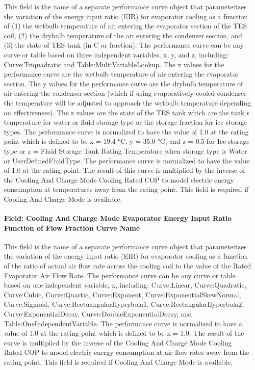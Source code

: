 This field is the name of a separate performance curve object that parameterizes the variation of the energy input ratio (EIR) for evaporator cooling as a function of (1) the wetbulb temperature of air entering the evaporator section of the TES coil, (2) the drybulb temperature of the air entering the condenser section, and (3) the state of TES tank (in C or fraction). The performance curve can be any curve or table based on three independent variables, x, y, and z, including: Curve:Triquadratic and Table:MultiVariableLookup. The x values for the performance curve are the wetbulb temperature of air entering the evaporator section. The y values for the performance curve are the drybulb temperature of air entering the condenser section (which if using evaporatively-cooled condenser the temperature will be adjusted to approach the wetbulb temperature depending on effectiveness). The z values are the state of the TES tank which are the tank s temperature for water or fluid storage type or the storage fraction for ice storage types. The performance curve is normalized to have the value of 1.0 at the rating point which is defined to be x = 19.4 °C, y = 35.0 °C, and z = 0.5 for Ice storage type or z = Fluid Storage Tank Rating Temperature when storage type is Water or UserDefinedFluidType. The performance curve is normalized to have the value of 1.0 at the rating point. The result of this curve is multiplied by the inverse of the Cooling And Charge Mode Cooling Rated COP to model electric energy consumption at temperatures away from the rating point. This field is required if Cooling And Charge Mode is available.

\paragraph{Field: Cooling And Charge Mode Evaporator Energy Input Ratio Function of Flow Fraction Curve Name}\label{field-cooling-and-charge-mode-evaporator-energy-input-ratio-function-of-flow-fraction-curve-name}

This field is the name of a separate performance curve object that parameterizes the variation of the energy input ratio (EIR) for evaporator cooling as a function of the ratio of actual air flow rate across the cooling coil to the value of the Rated Evaporator Air Flow Rate. The performance curve can be any curve or table based on one independent variable, x, including: Curve:Linear, Curve:Quadratic, Curve:Cubic, Curve:Quartic, Curve:Exponent, Curve:ExponentialSkewNormal, Curve:Sigmoid, Curve:RectuangularHyperbola1, Curve:RectangularHyperbola2, Curve:ExponentialDecay, Curve:DoubleExponentialDecay, and Table:OneIndependentVariable. The performance curve is normalized to have a value of 1.0 at the rating point which is defined to be x = 1.0. The result of the curve is multiplied by the inverse of the Cooling And Charge Mode Cooling Rated COP to model electric energy consumption at air flow rates away from the rating point. This field is required if Cooling And Charge Mode is available.


